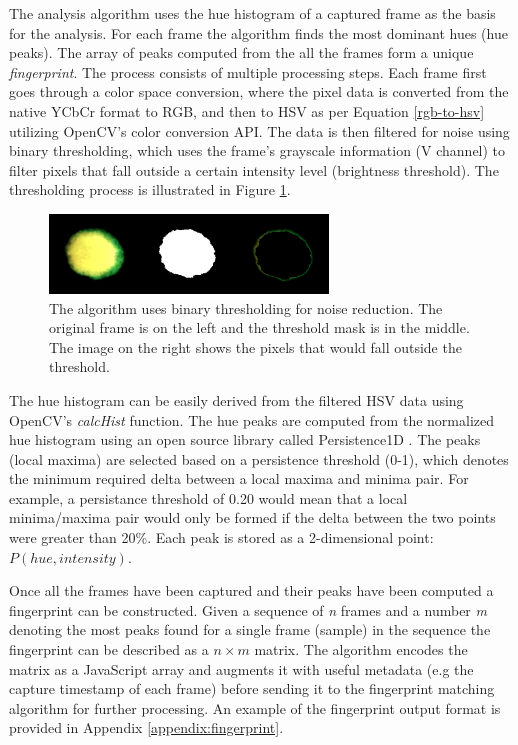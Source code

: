 \documentclass[thesis.tex]{subfiles}
\begin{document}
The analysis algorithm uses the hue histogram of a captured frame as the basis for the analysis. For each frame the algorithm finds the most dominant hues (hue peaks). The array of peaks computed from the all the frames form a unique \emph{fingerprint}. The process consists of multiple processing steps. Each frame first goes through a color space conversion, where the pixel data is converted from the native YCbCr format to RGB, and then to HSV as per Equation \ref{rgb-to-hsv} utilizing OpenCV's color conversion API. The data is then filtered for noise using binary thresholding, which uses the frame's grayscale information (V channel) to filter pixels that fall outside a certain intensity level (brightness threshold). The thresholding process is illustrated in Figure \ref{figure:binary-thresholding}.

\begin{figure}[h]
\centering \includegraphics[width=\textwidth,height=\textheight,keepaspectratio=true]{images/design_implementation/binary_thresholding}
\caption{The algorithm uses binary thresholding for noise reduction. The original frame is on the left and the threshold mask is in the middle. The image on the right shows the pixels that would fall outside the threshold.\label{figure:binary-thresholding}}
\end{figure}

The hue histogram can be easily derived from the filtered HSV data using OpenCV's \emph{calcHist} function. The hue peaks are computed from the normalized hue histogram using an open source library called Persistence1D \cite{persistence1d}. The peaks (local maxima) are selected based on a persistence threshold (0-1), which denotes the minimum required delta between a local maxima and minima pair. For example, a persistance threshold of 0.20 would mean that a local minima/maxima pair would only be formed if the delta between the two points were greater than 20\%. Each peak is stored as a 2-dimensional point: $P(hue, intensity)$.

Once all the frames have been captured and their peaks have been computed a fingerprint can be constructed. Given a sequence of \emph{n} frames and a number \emph{m} denoting the most peaks found for a single frame (sample) in the sequence the fingerprint can be described as a $n \times m$ matrix. The algorithm encodes the matrix as a JavaScript array and augments it with useful metadata (e.g the capture timestamp of each frame) before sending it to the fingerprint matching algorithm for further processing. An example of the fingerprint output format is provided in Appendix \ref{appendix:fingerprint}.
\end{document}
